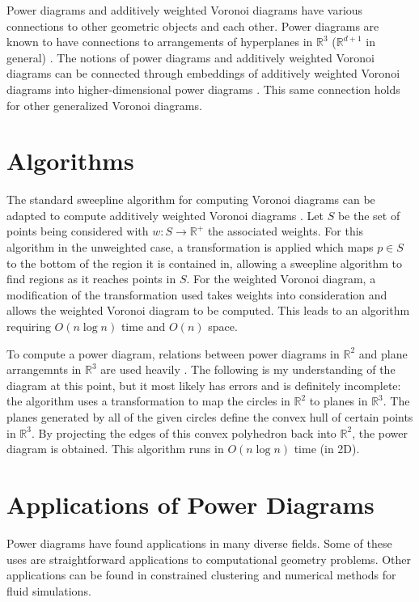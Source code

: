 \documentclass[a4paper]{article}
\newcommand{\R}{\mathbb{R}}
\begin{document}
Power diagrams and additively weighted Voronoi diagrams have various connections to other geometric objects and each other.
Power diagrams are known to have connections to arrangements of hyperplanes in $\R^3$ ($\R^{d+1}$ in general) \cite{aurenhammer_survey}. The notions
of power diagrams and additively weighted Voronoi diagrams can be connected through embeddings of additively weighted Voronoi diagrams into
higher-dimensional power diagrams \cite{aurenhammer_additive}. This same connection holds for other generalized Voronoi diagrams.

\section{Algorithms}

The standard sweepline algorithm for computing Voronoi diagrams can be adapted to compute additively weighted Voronoi diagrams
\cite{fortune_sweepline}. Let $S$ be the set of points being considered with $w:S \to \R^+$ the associated weights. For this algorithm in the
unweighted case, a transformation is applied which maps $p \in S$ to the bottom of the region it is contained in, allowing a sweepline algorithm to
find regions as it reaches points in $S$. For the weighted Voronoi diagram, a modification of the transformation used takes weights into consideration
and allows the weighted Voronoi diagram to be computed. This leads to an algorithm requiring $O(n \log n)$ time and $O(n)$ space.

To compute a power diagram, relations between power diagrams in $\R^2$ and plane arrangemnts in $\R^3$ are used heavily \cite{aurenhammer_power}.
The following is my understanding of the diagram at this point, but it most likely has errors and is definitely incomplete: the algorithm uses a
transformation to map the circles in $\R^2$ to planes in $\R^3$. The planes generated by all of the given circles define the
convex hull of certain points in $\R^3$. By projecting the edges of this convex polyhedron back into $\R^2$, the power diagram is obtained. This algorithm runs
in $O(n \log n)$ time (in 2D).

\section{Applications of Power Diagrams}

Power diagrams have found applications in many diverse fields. Some of these uses are straightforward applications to computational geometry problems. Other
applications can be found in constrained clustering and numerical methods for fluid simulations.
\end{document}
